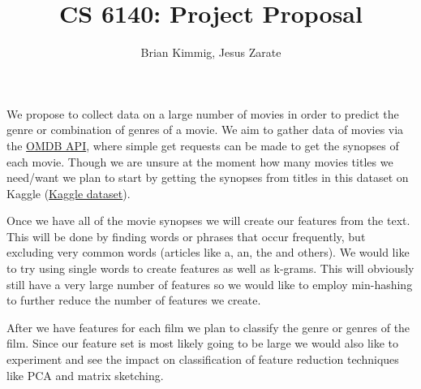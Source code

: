 \documentclass[12pt]{article}
\title{CS 6140: Project Proposal}
\author{Brian Kimmig, Jesus Zarate}
\date{}
\begin{document}
\maketitle

We propose to collect data on a large number of movies in order to predict the genre or combination of genres of a movie. We aim to gather data of movies via the \href{https://www.omdbapi.com/}{OMDB API}, where simple get requests can be made to get the synopses of each movie. Though we are unsure at the moment how many movies titles we need/want we plan to start by getting the synopses from titles in this dataset on Kaggle (\href{https://www.kaggle.com/deepmatrix/imdb-5000-movie-dataset}{Kaggle dataset}). 

Once we have all of the movie synopses we will create our features from the text. This will be done by finding words or phrases that occur frequently, but excluding very common words (articles like a, an, the and others). We would like to try using single words to create features as well as k-grams. This will obviously still have a very large number of features so we would like to employ min-hashing to further reduce the number of features we create. 

After we have features for each film we plan to classify the genre or genres of the film. Since our feature set is most likely going to be large we would also like to experiment and see the impact on classification of feature reduction techniques like PCA and matrix sketching.
\end{document}

